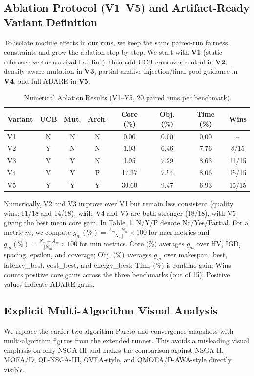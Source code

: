 \documentclass[preprint,12pt]{elsarticle}
\begin{document}
\subsection{Ablation Protocol (V1--V5) and Artifact-Ready Variant Definition}
To isolate module effects in our runs, we keep the same paired-run fairness constraints and grow the ablation step by step. We start with \textbf{V1} (static reference-vector survival baseline), then add UCB crossover control in \textbf{V2}, density-aware mutation in \textbf{V3}, partial archive injection/final-pool guidance in \textbf{V4}, and full ADARE in \textbf{V5}.

\begin{table}[H]
\caption{Numerical Ablation Results (V1--V5, 20 paired runs per benchmark)}
\label{tab:ablation_design}
\centering
\small
\begin{tabular*}{\textwidth}{@{\extracolsep{\fill}}lccccccc@{}}
\toprule
Variant & UCB & Mut. & Arch. & Core (\%) & Obj. (\%) & Time (\%) & Wins \\
\midrule
V1 & N & N & N & 0.00 & 0.00 & 0.00 & -- \\
V2 & Y & N & N & 1.03 & 6.46 & 7.76 & 8/15 \\
V3 & Y & Y & N & 1.95 & 7.29 & 8.63 & 11/15 \\
V4 & Y & Y & P & 17.37 & 7.54 & 8.06 & 15/15 \\
V5 & Y & Y & Y & 30.60 & 9.47 & 6.93 & 15/15 \\
\bottomrule
\end{tabular*}
\end{table}

Numerically, V2 and V3 improve over V1 but remain less consistent (quality wins: 11/18 and 14/18), while V4 and V5 are both stronger (18/18), with V5 giving the best mean core gain. In Table~\ref{tab:ablation_design}, N/Y/P denote No/Yes/Partial. For a metric $m$, we compute $g_m(\%)=\frac{A_m-N_m}{|N_m|}\times100$ for max metrics and $g_m(\%)=\frac{N_m-A_m}{|N_m|}\times100$ for min metrics. Core (\%) averages $g_m$ over HV, IGD, spacing, epsilon, and coverage; Obj. (\%) averages $g_m$ over makespan\_best, latency\_best, cost\_best, and energy\_best; Time (\%) is runtime gain; Wins counts positive core gains across the three benchmarks (out of 15). Positive values indicate ADARE gains.

\subsection{Explicit Multi-Algorithm Visual Analysis}
We replace the earlier two-algorithm Pareto and convergence snapshots with multi-algorithm figures from the extended runner. This avoids a misleading visual emphasis on only NSGA-III and makes the comparison against NSGA-II, MOEA/D, QL-NSGA-III, OVEA-style, and QMOEA/D-AWA-style directly visible.
\end{document}
